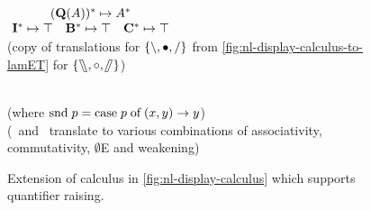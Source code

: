 \begin{figure}[h]
\begin{mdframed}
\begin{pfbox}
    \end{pfbox}
    \\[1\baselineskip]
    \hrulefill
    \\[1\baselineskip]
    {
      \renewcommand{\arraystretch}{1.5}%
      \(\!
      \begin{array}{c c c}
        \multicolumn{3}{c}{\tr[({\q[A]})]\mapsto\tr[A]}\\
        \tr[\I]\mapsto\top      & \tr [\B]\mapsto\top     & \tr [\C]\mapsto\top\\
      \end{array}
      \)
    }
    \\[1\baselineskip]
    (copy of translations for $\{\mathbin{\backslash},\bullet,\mathbin{\slash}\}$ from
    \autoref{fig:nl-display-calculus-to-lamET} for
    $\{\fatbslash,\mathbin{\circ},\!\!\fatslash\:\}$)
    \\[1\baselineskip]
    \begin{pfbox}
    \end{pfbox}
    \begin{pfbox}
    \end{pfbox}
    \begin{pfbox}
      \RightLabel{$\I^-$}
    \end{pfbox}
    \\[1\baselineskip]
    (where $\text{snd}\;p=\text{case}\;p\;\text{of}\;(x, y)\rightarrow y$)
    \\[1\baselineskip]
    (\B\ and \C\ translate to various combinations of associativity,
    commutativity, $\emptyset$E and weakening)
    \\
    \vspace*{\baselineskip}
  \end{mdframed}
  \caption{
    Extension of calculus in \autoref{fig:nl-display-calculus} which
    supports quantifier raising.}%
  \label{fig:extension-quantifier-raising}
\end{figure}
